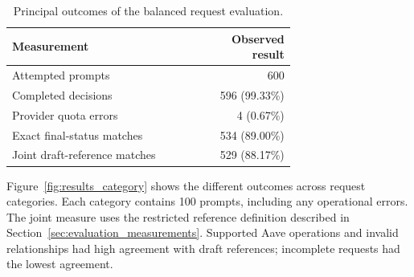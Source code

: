 \begin{table}[H]
    \centering\small
    \caption{Principal outcomes of the balanced request evaluation.}
    \label{tab:results_balanced_summary}
    \begin{tabular}{p{0.70\linewidth}r}
    \hline
    \textbf{Measurement} & \textbf{Observed result} \\
    \hline
    Attempted prompts & 600 \\
    Completed decisions & 596 (99.33\%) \\
    Provider quota errors & 4 (0.67\%) \\
    Exact final-status matches & 534 (89.00\%) \\
    Joint draft-reference matches & 529 (88.17\%) \\
    \hline
    \end{tabular}
\end{table}

Figure~\ref{fig:results_category} shows the different outcomes across
request categories. Each category contains 100
prompts, including any operational errors. The joint measure uses the
restricted reference definition described in Section~\ref{sec:evaluation_measurements}. Supported Aave operations and invalid relationships
had high agreement with draft references; incomplete requests had the
lowest agreement.


